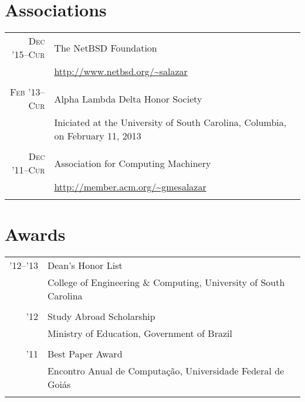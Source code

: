 \documentclass[a4paper,10pt]{article}
\begin{document}
\section{Associations}

\begin{tabular}{r|p{11cm}}

  \textsc{Dec '15--Cur}
  & The NetBSD Foundation\\
  & \footnotesize{\url{http://www.netbsd.org/~salazar}}
  \\\multicolumn{2}{c}{}\\

  \textsc{Feb '13--Cur}
  & Alpha Lambda Delta Honor Society\\
  & \footnotesize{Iniciated at the University of South Carolina, Columbia, on February 11, 2013}\\
  \multicolumn{2}{c}{}\\

  \textsc{Dec '11--Cur}
  & Association for Computing Machinery\\
  & \footnotesize{\url{http://member.acm.org/~gmesalazar}}
  \\\multicolumn{2}{c}{}\\
  
\end{tabular}

\section{Awards}
\begin{tabular}{r|p{11cm}}

  \textsc{'12--'13}
  & Dean's Honor List\\
  & College of Engineering \& Computing, University of South Carolina\\
  \multicolumn{2}{c}{}\\

  \textsc{'12}
  & Study Abroad Scholarship\\
  & Ministry of Education, Government of Brazil\\
  \multicolumn{2}{c}{}\\

  \textsc{'11}
  & Best Paper Award\\
  & Encontro Anual de Computação, Universidade Federal de Goiás\\
  \multicolumn{2}{c}{}\\

\end{tabular}
\end{document}
